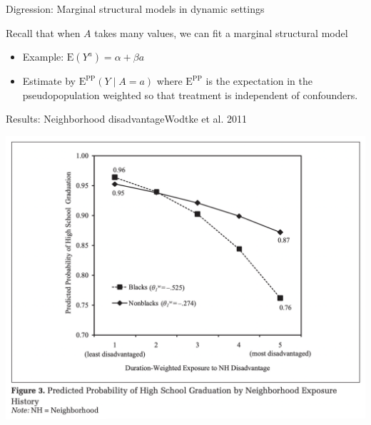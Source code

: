 \documentclass{beamer}
\newcommand\E{\text{E}}
\begin{document}
\begin{frame}{Digression: Marginal structural models in dynamic settings} \pause

Recall that when $A$ takes many values, we can fit a marginal structural model \pause
\begin{itemize}
\item Example: $\E(Y^a) = \alpha + \beta a$ \pause
\item Estimate by $\E^\text{PP}(Y\mid A = a)$ where $\E^\text{PP}$ is the expectation in the pseudopopulation weighted so that treatment is independent of confounders.
\end{itemize}

\end{frame}


\begin{frame}{Results: Neighborhood disadvantage}{Wodtke et al. 2011} \pause

\includegraphics[width = .9\textwidth]{figures/whe_fig3}

\end{frame}
\end{document}
